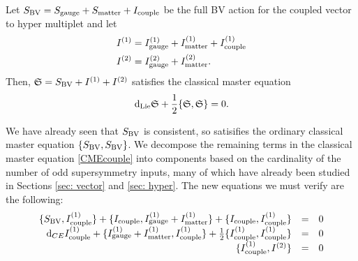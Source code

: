 \documentclass[10pt, oneside]{article}
\begin{document}
\begin{thm}
Let $S_{\rm BV} = S_{\rm gauge} + S_{\rm matter} + I_{\rm couple}$ be the full BV action for the coupled vector to hyper multiplet and let
\begin{align*}
I^{(1)} & = I^{(1)}_{\rm gauge} + I^{(1)}_{\rm matter} + I^{(1)}_{\rm couple} \\
I^{(2)} & = I^{(2)}_{\rm gauge} + I^{(2)}_{\rm matter} .
\end{align*}
Then, $\mathfrak S = S_{\rm BV} + I^{(1)} + I^{(2)}$ satisfies the classical master equation
\begin{equation}\label{CMEcouple}
{\rm d}_{\rm Lie} \mathfrak S + \frac{1}{2} \{\mathfrak S, \mathfrak S\} = 0 .
\end{equation}
\end{thm}

We have already seen that $S_{\rm BV}$ is consistent, so satisifies the ordinary classical master equation $\{S_{\rm BV}, S_{\rm BV}\}$. 
We decompose the remaining terms in the classical master equation \ref{CMEcouple} into components based on the cardinality of the number of odd supersymmetry inputs, many of which have already been studied in Sections \ref{sec: vector} and \ref{sec: hyper}. 
The new equations we must verify are the following:
\begin{equation}\label{CMEhyper2}
\begin{array}{rrrrrr}
\{S_{\rm BV} , I^{(1)}_{\rm couple}\} + \{I_{\rm couple}, I^{(1)}_{\rm gauge} + I^{(1)}_{\rm matter}\} + \{I_{\rm couple}, I^{(1)}_{\rm couple}\} & = & 0 \\ 
{\rm d}_{CE} I^{(1)}_{\rm couple} + \{I^{(1)}_{\rm gauge} + I^{(1)}_{\rm matter}, I^{(1)}_{\rm couple}\} + \frac{1}{2} \{I_{\rm couple}^{(1)}, I_{\rm couple}^{(1)}\} & = & 0 \\
\{I_{\rm couple}^{(1)}, I^{(2)}\} & =& 0 \\
\end{array}
\end{equation}
\end{document}
